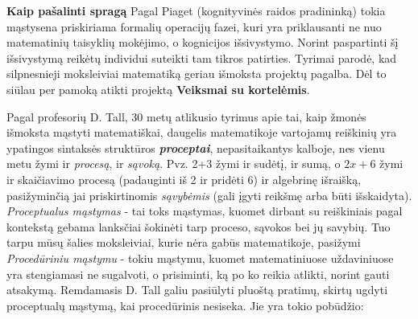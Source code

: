 \documentclass[a4paper]{article}
\begin{document}
\textbf{Kaip pašalinti spragą} Pagal Piaget (kognityvinės raidos pradininką) tokia mąstysena priskiriama formalių operacijų fazei, kuri yra priklausanti ne nuo matematinių taisyklių mokėjimo, o kognicijos išsivystymo. Norint paspartinti šį išsivystymą reikėtų individui suteikti tam tikros patirties. Tyrimai parodė, kad silpnesnieji moksleiviai matematiką geriau išmoksta projektų pagalba. Dėl to siūlau per pamoką atikti projektą \textbf{Veiksmai su kortelėmis}. 

Pagal profesorių D. Tall, 30 metų atlikusio tyrimus apie tai, kaip žmonės išmoksta mąstyti matematiškai, daugelis matematikoje vartojamų reiškinių yra ypatingos sintaksės struktūros \textbf{\textit{proceptai}}, nepasitaikantys kalboje, nes vienu metu žymi ir \textit{procesą}, ir \textit{sąvoką}. Pvz. 2+3 žymi ir sudėtį, ir sumą, o $2x+6$ žymi ir skaičiavimo procesą (padauginti iš 2 ir pridėti 6) ir algebrinę išraišką, pasižyminčią jai priskirtinomis \textit{sąvybėmis} (gali įgyti reikšmę arba būti išskaidyta). \textit{Proceptualus mąstymas} - tai toks mąstymas, kuomet dirbant su reiškiniais pagal kontekstą gebama lanksčiai šokinėti tarp proceso, sąvokos bei jų savybių. Tuo tarpu mūsų šalies moksleiviai, kurie nėra gabūs matematikoje, pasižymi \textit{Procedūriniu mąstymu} - tokiu mąstymu, kuomet matematiniuose uždaviniuose yra stengiamasi ne sugalvoti, o prisiminti, ką po ko reikia atlikti, norint gauti atsakymą. Remdamasis D. Tall galiu pasiūlyti pluoštą pratimų, skirtų ugdyti proceptualų mąstymą, kai procedūrinis nesiseka. Jie yra tokio pobūdžio: 
\end{document}
